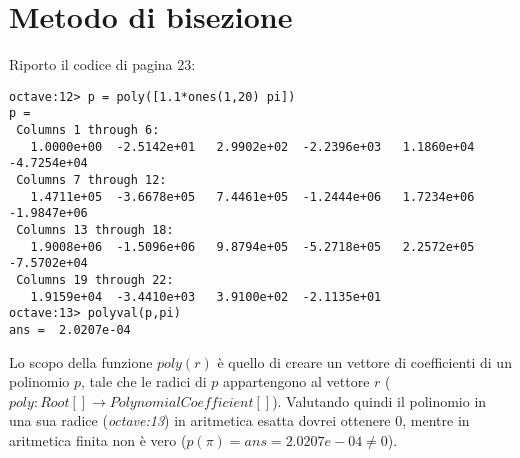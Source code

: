 \section{Metodo di bisezione}
\label{sec:metodoDiBisezione}
Riporto il codice di pagina 23:
\begin{lstlisting}
octave:12> p = poly([1.1*ones(1,20) pi])
p =
 Columns 1 through 6:
   1.0000e+00  -2.5142e+01   2.9902e+02  -2.2396e+03   1.1860e+04  -4.7254e+04
 Columns 7 through 12:
   1.4711e+05  -3.6678e+05   7.4461e+05  -1.2444e+06   1.7234e+06  -1.9847e+06
 Columns 13 through 18:
   1.9008e+06  -1.5096e+06   9.8794e+05  -5.2718e+05   2.2572e+05  -7.5702e+04
 Columns 19 through 22:
   1.9159e+04  -3.4410e+03   3.9100e+02  -2.1135e+01
octave:13> polyval(p,pi)
ans =  2.0207e-04
\end{lstlisting}
Lo scopo della funzione $poly(r)$ \`e quello di creare un vettore di coefficienti
di un polinomio $p$, tale che le radici di $p$ appartengono al vettore $r$ 
($poly: Root[] \rightarrow PolynomialCoefficient[]$).
Valutando quindi il polinomio in una sua radice (\emph{octave:13}) in aritmetica
esatta dovrei ottenere 0, mentre in aritmetica finita non \`e vero 
($p(\pi) = ans =  2.0207e-04 \not = 0$).

